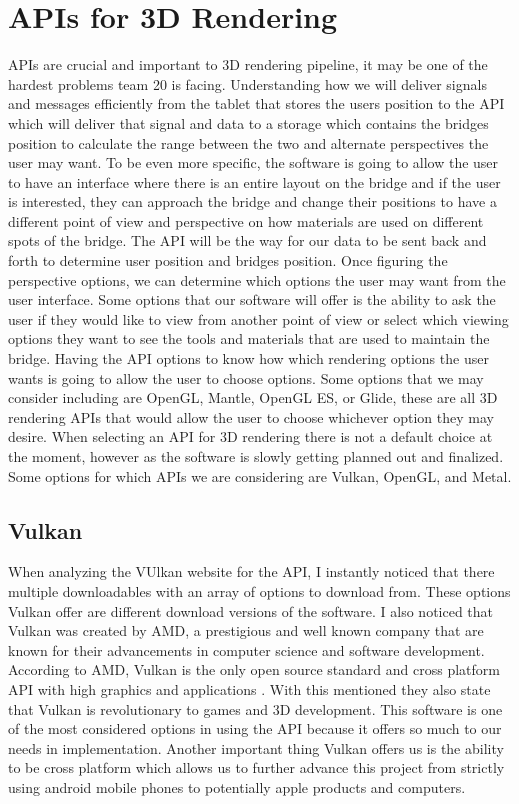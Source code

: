 \documentclass[a4paper, 11pt]{article} %
\begin{document}
\section{APIs for 3D Rendering}
	APIs are crucial and important to 3D rendering pipeline, it may be one of the hardest problems team 20 is facing. Understanding how we will deliver signals and messages efficiently from the tablet that stores the users position to the API which will deliver that signal and data to a storage which contains the bridges position to calculate the range between the two and alternate perspectives the user may want. To be even more specific, the software is going to allow the user to have an interface where there is an entire layout on the bridge and if the user is interested, they can approach the bridge and change their positions to have a different point of view and perspective on how materials are used on different spots of the bridge. The API will be the way for our data to be sent back and forth to determine user position and bridges position. Once figuring the perspective options, we can determine which options the user may want from the user interface. Some options that our software will offer is the ability to ask the user if they would like to view from another point of view or select which viewing options they want to see the tools and materials that are used to maintain the bridge. Having the API options to know how which rendering options the user wants is going to allow the user to choose options. Some options that we may consider including are OpenGL, Mantle, OpenGL ES, or Glide, these are all 3D rendering APIs that would allow the user to choose whichever option they may desire. When selecting an API for 3D rendering there is not a default choice at the moment, however as the software is slowly getting planned out and finalized. Some options for which APIs we are considering are Vulkan, OpenGL, and Metal.

\subsection{Vulkan}
	When analyzing the VUlkan website for the API, I instantly noticed that there multiple downloadables with an array of options to download from. These options Vulkan offer are different download versions of the software. I also noticed that Vulkan was created by AMD, a prestigious and well known company that are known for their advancements in computer science and software development. According to AMD, Vulkan is the only open source standard and cross platform API with high graphics and applications \cite{Vulkan:2018}. With this mentioned they also state that Vulkan is revolutionary to games and 3D development. This software is one of the most considered options in using the API because it offers so much to our needs in implementation. Another important thing Vulkan offers us is the ability to be cross platform which allows us to further advance this project from strictly using android mobile phones to potentially apple products and computers.
\end{document}
